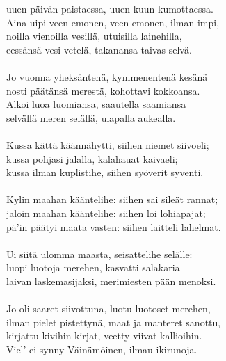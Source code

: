 uuen päivän paistaessa, uuen kuun kumottaessa.              \\
Aina uipi veen emonen, veen emonen, ilman impi,             \\
noilla vienoilla vesillä, utuisilla lainehilla,             \\
eessänsä vesi vetelä, takanansa taivas selvä.               \\
                                                            \\
Jo vuonna yheksäntenä, kymmenentenä kesänä                  \\
nosti päätänsä merestä, kohottavi kokkoansa.                \\
Alkoi luoa luomiansa, saautella saamiansa                   \\
selvällä meren selällä, ulapalla aukealla.                  \\
                                                            \\
Kussa kättä käännähytti, siihen niemet siivoeli;            \\
kussa pohjasi jalalla, kalahauat kaivaeli;                  \\
kussa ilman kuplistihe, siihen syöverit syventi.            \\
                                                            \\
Kylin maahan kääntelihe: siihen sai sileät rannat;          \\
jaloin maahan kääntelihe: siihen loi lohiapajat;            \\
pä'in päätyi maata vasten: siihen laitteli lahelmat.        \\
                                                            \\
Ui siitä ulomma maasta, seisattelihe selälle:               \\
luopi luotoja merehen, kasvatti salakaria                   \\
laivan laskemasijaksi, merimiesten pään menoksi.            \\
                                                            \\
Jo oli saaret siivottuna, luotu luotoset merehen,           \\
ilman pielet pistettynä, maat ja manteret sanottu,          \\
kirjattu kivihin kirjat, veetty viivat kallioihin.          \\
Viel' ei synny Väinämöinen, ilmau ikirunoja.                \\
